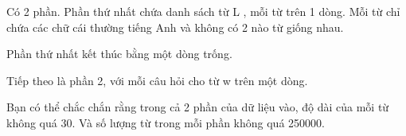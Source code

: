 Có 2 phần. Phần thứ nhất chứa danh sách từ       L      , mỗi từ trên 1 dòng. Mỗi từ chỉ chứa các chữ cái thường tiếng Anh và không có 2 nào từ giống nhau.  

   Phần thứ nhất kết thúc bằng một dòng trống.  

   Tiếp theo là phần 2, với mỗi câu hỏi cho từ       w      trên một dòng.  

   Bạn có thể chắc chắn rằng trong cả 2 phần của dữ liệu vào, độ dài của mỗi từ không quá 30. Và số lượng từ trong mỗi phần không quá 250000.